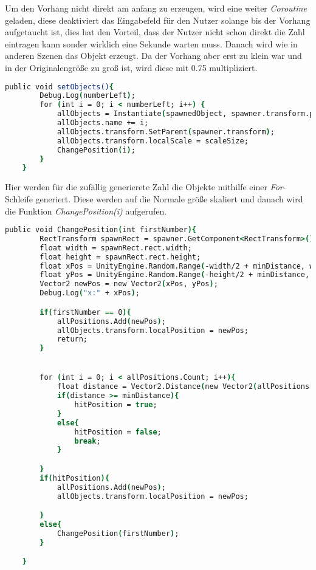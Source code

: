 Um den Vorhang nicht direkt am anfang zu erzeugen, wird eine weiter \textit{Coroutine} geladen, diese deaktiviert das Eingabefeld für den Nutzer solange bis der Vorhang aufgetaucht ist, dies hat den Vorteil, dass der Nutzer nicht schon direkt die Zahl eintragen kann sonder wirklich eine Sekunde warten muss. Danach wird wie in anderen Szenen das Objekt erzeugt. Da der Vorhang aber erst zu klein war und in der Originalengröße zu groß ist, wird diese mit 0.75 multipliziert.\\
\begin{lstlisting}[language=csh, caption={hideCircle.cs setObjects-Funktion}]
	public void setObjects(){
		Debug.Log(numberLeft);
		for (int i = 0; i < numberLeft; i++) {
			allObjects = Instantiate(spawnedObject, spawner.transform.position, Quaternion.identity);
			allObjects.name += i;
			allObjects.transform.SetParent(spawner.transform);
			allObjects.transform.localScale = scaleSize;
			ChangePosition(i);
		}
	}
\end{lstlisting}
Hier werden für die zufällig generierete Zahl die Objekte mithilfe einer \textit{For}-Schleife generiert. Diese werden auf die Normale größe skaliert und danach wird die Funktion \textit{ChangePosition(i)} aufgerufen.\\
\begin{lstlisting}[language=csh, caption={hideCircle.cs ChangePosition-Funktion}]
	public void ChangePosition(int firstNumber){
		RectTransform spawnRect = spawner.GetComponent<RectTransform>();
		float width = spawnRect.rect.width;
		float height = spawnRect.rect.height;
		float xPos = UnityEngine.Random.Range(-width/2 + minDistance, width/2 - minDistance);
		float yPos = UnityEngine.Random.Range(-height/2 + minDistance, height/2 - minDistance);
		Vector2 newPos = new Vector2(xPos, yPos);
		Debug.Log("x:" + xPos);

		if(firstNumber == 0){
			allPositions.Add(newPos);
			allObjects.transform.localPosition = newPos;
			return;
		}


		for (int i = 0; i < allPositions.Count; i++){
			float distance = Vector2.Distance(new Vector2(allPositions[i].x, allPositions[i].y), new Vector2(newPos.x, newPos.y));
			if(distance >= minDistance){
				hitPosition = true;
			}
			else{
				hitPosition = false;
				break;
			}

		}
		if(hitPosition){
			allPositions.Add(newPos);
			allObjects.transform.localPosition = newPos;

		}
		else{
			ChangePosition(firstNumber);
		}

	}
\end{lstlisting}
